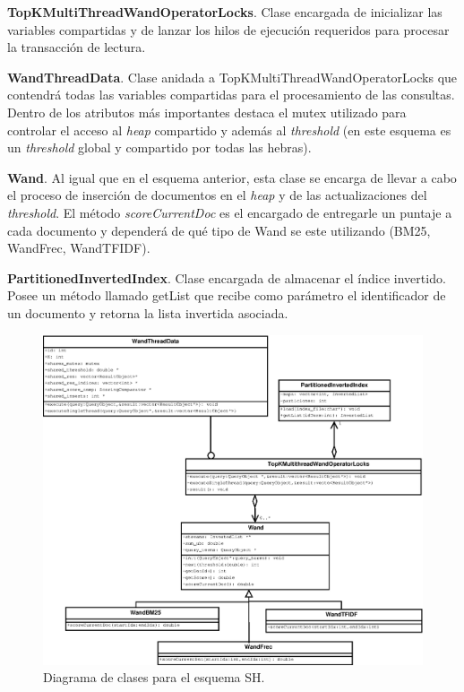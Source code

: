 \begin{list}{}{}
	\item \textbf{TopKMultiThreadWandOperatorLocks}. Clase encargada de inicializar las variables compartidas y de lanzar los hilos de ejecución requeridos para procesar la transacción de lectura.
	
	\item \textbf{WandThreadData}. Clase anidada a TopKMultiThreadWandOperatorLocks que contendrá todas las variables compartidas para el procesamiento de las consultas. Dentro de los atributos más importantes destaca el mutex utilizado para controlar el acceso al \textit{heap} compartido y además al \textit{threshold} (en este esquema es un \textit{threshold} global y compartido por todas las hebras).
	
	\item \textbf{Wand}. Al igual que en el esquema anterior, esta clase se encarga de llevar a cabo el proceso de inserción de documentos en el \textit{heap} y de las actualizaciones del \textit{threshold}. El método \textit{scoreCurrentDoc} es el encargado de entregarle un puntaje a cada documento y dependerá de qué tipo de Wand se este utilizando (BM25, WandFrec, WandTFIDF). 

	\item \textbf{PartitionedInvertedIndex}. Clase encargada de almacenar el índice invertido. Posee un método llamado getList que recibe como parámetro el identificador de un documento y retorna la lista invertida asociada. 

\end{list}

\begin{figure}[!ht]
\centering
\includegraphics[scale=.75]{images/TopKMultiThreadWandOperatorLocks.eps}
\caption{Diagrama de clases para el esquema SH.}
\label{fig:TopKMultiThreadWandOperatorLocks}
\end{figure}

